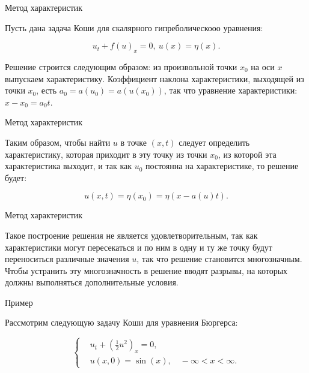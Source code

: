 \documentclass[10pt,xcolor=pst,aspectratio=169]{beamer}
\begin{document}
\begin{frame}{Метод характеристик}

    \transdissolve[duration=0.1]
    \justifying
    \large

    Пусть дана задача Коши для скалярного гипреболическооо уравнения:

    \[
        u_{t} + f(u)_{x} = 0, \: u(x) = \eta(x).
    \]

    Решение строится следующим образом: из произвольной точки $x_{0}$ на оси $x$ выпускаем характеристику. Коэффициент наклона характеристики, выходящей из точки $x_{0}$, есть $a_{0} = a(u_{0}) = a(u(x_{0}))$, так что уравнение характеристики: $x - x_{0} = a_{0} t$.\\

\end{frame}

\begin{frame}{Метод характеристик}

    \transdissolve[duration=0.1]
    \justifying
    \large

    Таким образом, чтобы найти $u$ в точке $(x, t)$ следует определить характеристику, которая приходит в эту точку из точки $x_{0}$, из которой эта характеристика выходит, и так как $u_{0}$ постоянна на характеристике, то решение будет:

    \[
        u(x, t) = \eta(x_{0}) = \eta(x - a(u) t).
    \]

\end{frame}


\begin{frame}{Метод характеристик}

    \transdissolve[duration=0.1]
    \justifying
    \large

    Такое построение решения не является удовлетворительным, так как характеристики могут пересекаться и по ним в одну и ту же точку будут переноситься различные значения $u$, так что решение становится многозначным. Чтобы устранить эту многозначность в решение вводят разрывы, на которых должны выполняться дополнительные условия.

\end{frame}

\begin{frame}{Пример}

    \transdissolve[duration=0.1]
    \justifying
    \large

    Рассмотрим следующую задачу Коши для уравнения Бюргерса:

    \[
        \begin{cases}
            &u_{t} + \left( \frac{1}{2} u^{2} \right)_{x} = 0, \\
            &u(x, 0) = \sin (x), \quad - \infty < x < \infty.
        \end{cases}
    \]

\end{frame}
\end{document}
